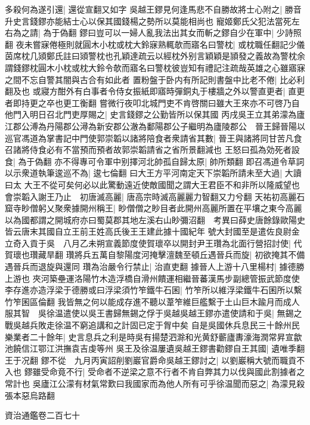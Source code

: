 多殺何為遂引還|{
	還從宣翻又如字}
吳越王鏐見何逢馬悲不自勝故將士心附之|{
	勝音升史言錢鏐亦能結士心以保其國錢楊之勢所以莫能相尚也}
寵姬鄭氏父犯法當死左右為之請|{
	為于偽翻}
鏐曰豈可以一婦人亂我法出其女而斬之鏐自少在軍中|{
	少詩照翻}
夜未嘗寐倦極則就圓木小枕或枕大鈴寐熟輒欹而寤名曰警枕|{
	或枕職任翻記少儀茵席枕几熲鄭氏註曰熲警枕也孔穎達疏云以經枕外别言穎穎是頴發之義故為警枕余謂錢鏐枕圓木小枕或枕大鈴令欹而寤名曰警枕彼豈知有禮記注疏哉英雄之心雖寤寐之間不忘自警其闇與古合有如此者}
置粉盤于卧内有所記則書盤中比老不倦|{
	比必利翻及也}
或寢方酣外有白事者令侍女振紙即寤時彈銅丸于樓牆之外以警直更者|{
	直更者即持更之卒也更工衡翻}
嘗微行夜叩北城門吏不肯啓關曰雖大王來亦不可啓乃自他門入明日召北門吏厚賜之|{
	史言錢鏐之公勤皆所以保其國}
丙戌吳王立其弟濛為廬江郡公溥為丹陽郡公潯為新安郡公澈為鄱陽郡公子繼明為廬陵郡公　晉王歸晉陽以巡官馮道為掌書記中門使郭崇韜以諸將陪食者衆請省其數|{
	晉王與諸將同甘苦凡食召諸將侍食必有不當預而預者故郭崇韜請省之省所景翻減也}
王怒曰孤為効死者設食|{
	為于偽翻}
亦不得專可令軍中别擇河北帥孤自歸太原|{
	帥所類翻}
即召馮道令草詞以示衆道執筆逡巡不為|{
	逡七倫翻}
曰大王方平河南定天下崇韜所請未至大過|{
	大讀曰太}
大王不從可矣何必以此驚動遠近使敵國聞之謂大王君臣不和非所以隆威望也會崇韜入謝王乃止　初唐滅高麗|{
	唐高宗時滅高麗麗力智翻又力兮翻}
天祐初高麗石窟寺眇僧躬乂聚衆據開州稱王|{
	眇僧僧之眇目者此開州高麗所置在平壤之東今高麗以為國都謂之開城府亦曰蜀莫郡其地左溪右山眇彌沼翻　考異曰薛史唐餘錄歐陽史皆云唐末其國自立王前王姓高氏後王王建此據十國紀年}
號大封國至是遣佐良尉金立奇入貢于吳　八月乙未朔宣義節度使賀瓌卒以開封尹王瓚為北面行營招討使|{
	代賀瓌也瓚藏旱翻}
瓚將兵五萬自黎陽度河掩擊澶魏至頓丘遇晉兵而旋|{
	初欲掩其不備遇晉兵而退旋與還同}
瓚為治嚴令行禁止|{
	治直吏翻}
據晉人上游十八里楊村|{
	據德勝上游也}
夾河築壘運洛陽竹木造浮橋自滑州饋運相繼晉蕃漢馬步副總管振武節度使李存進亦造浮梁于德勝或曰浮梁須竹笮鐵牛石囷|{
	竹笮所以維浮梁鐵牛石囷所以繫竹笮囷區倫翻}
我皆無之何以能成存進不聽以葦笮維巨艦繫于土山巨木踰月而成人服其智　吳徐温遣使以吳王書歸無錫之俘于吳越吳越王鏐亦遣使請和于吳|{
	無錫之戰吳越兵敗走徐温不窮追講和之計固已定于胷中矣}
自是吳國休兵息民三十餘州民樂業者二十餘年|{
	史言息兵之利是時吳有揚楚泗滁和光黄舒蘄廬夀濠海潤常昇宣歙池饒信江鄂江洪撫袁吉虔等州}
吳王及徐温屢遺吳越王鏐書勸鏐自王其國|{
	遺唯季翻王于况翻}
鏐不從　九月丙寅詔削劉巖官爵命吳越王鏐討之|{
	以劉巖稱大號而職貢不入也}
鏐雖受命竟不行|{
	受命者不逆梁之意不行者不肯自弊其力以伐與國此割據者之常計也}
吳廬江公濛有材氣常歎曰我國家而為他人所有可乎徐温聞而惡之|{
	為濛見殺張本惡烏路翻}


資治通鑑卷二百七十
